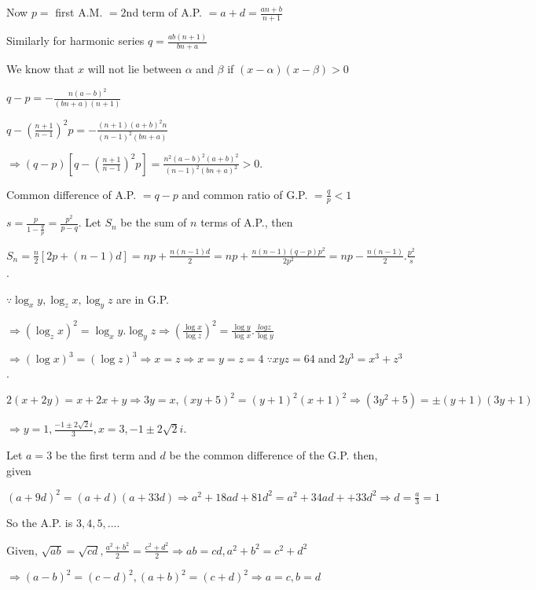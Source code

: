   Now $p =$ first A.M. $= 2$nd term of A.P. $= a + d = \frac{an + b}{n + 1}$

  Similarly for harmonic series $q = \frac{ab(n + 1)}{bn + a}$

  We know that $x$ will not lie between $\alpha$ and $\beta$ if $(x - \alpha)(x - \beta) > 0$

  $q - p = -\frac{n(a - b)^2}{(bn + a)(n + 1)}$

  $q - \left(\frac{n + 1}{n - 1}\right)^2p = -\frac{(n + 1)(a + b)^2n}{(n - 1)^2(bn + a)}$

  $\Rightarrow (q - p)\left[q - \left(\frac{n + 1}{n - 1}\right)^2p\right] = \frac{n^2(a - b)^2(a + b)^2}{(n
    - 1)^2(bn + a)^2} > 0$.
\item Common difference of A.P. $= q - p$ and common ratio of G.P. $= \frac{q}{p} < 1$

  $s = \frac{p}{1 - \frac{q}{p}} = \frac{p^2}{p - q}$. Let $S_n$ be the sum of $n$ terms of A.P., then

  $S_n = \frac{n}{2}[2p + (n - 1)d] = np + \frac{n(n - 1)d}{2} = np + \frac{n(n - 1)(q - p)p^2}{2p^2} = np -
  \frac{n(n -1)}{2}.\frac{p^2}{s}$.
\item $\because \log_xy, \log_zx, \log_yz$ are in G.P.

  $\Rightarrow (\log_zx)^2 = \log_xy.\log_yz \Rightarrow \left(\frac{\log x}{\log z}\right)^2 = \frac{\log
  y}{\log x}.\frac{log z}{\log y}$

  $\Rightarrow (\log x)^3 = (\log z)^3 \Rightarrow x = z\Rightarrow x = y = z = 4\;\because xyz =
  64\;\text{and}\;2y^3 = x^3 + z^3$.
\item $2(x + 2y) = x + 2x + y \Rightarrow 3y = x, (xy + 5)^2 = (y + 1)^2(x + 1)^2 \Rightarrow (3y^2 + 5) =
  \pm(y + 1)(3y + 1)$

  $\Rightarrow y = 1, \frac{-1\pm2\sqrt{2}i}{3}, x = 3, -1\pm2\sqrt{2}i$.
\item Let $a = 3$ be the first term and $d$ be the common difference of the G.P. then, given

  $(a + 9d)^2 = (a + d)(a + 33d)\Rightarrow a^2 + 18ad + 81d^2 = a^2 + 34ad + + 33d^2 \Rightarrow d =
  \frac{a}{3} = 1$

  So the A.P. is $3, 4, 5, \ldots$.
\item Given, $\sqrt{ab} = \sqrt{cd}, \frac{a^2 + b^2}{2} = \frac{c^2 + d^2}{2}\Rightarrow ab = cd, a^2 + b^2
  = c^2 + d^2$

  $\Rightarrow (a - b)^2 = (c - d)^2, (a + b)^2 = (c + d)^2\Rightarrow a = c, b = d$

